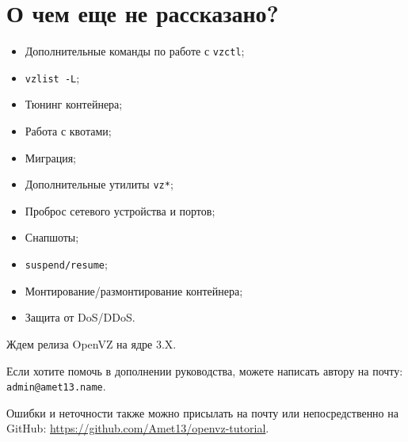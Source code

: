 \section{О чем еще не рассказано?}

\begin{itemize}
    \item Дополнительные команды по работе с \texttt{vzctl};
    \item \texttt{vzlist -L};
    \item Тюнинг контейнера;
    \item Работа с квотами;
    \item Миграция;
    \item Дополнительные утилиты \texttt{vz*};
    \item Проброс сетевого устройства и портов;
    \item Снапшоты;
    \item \texttt{suspend/resume};
    \item Монтирование/размонтирование контейнера;
    \item Защита от DoS/DDoS.
\end{itemize}

Ждем релиза OpenVZ на ядре 3.X.

Если хотите помочь в дополнении руководства, можете написать автору на почту: \texttt{admin@amet13.name}.

Ошибки и неточности также можно присылать на почту или непосредственно на GitHub: \url{https://github.com/Amet13/openvz-tutorial}.

\clearpage
